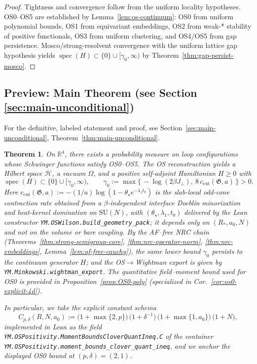 \documentclass[11pt]{amsart}
\theoremstyle{plain}
\newtheorem{theorem}{Theorem}[section]
\theoremstyle{definition}
\theoremstyle{remark}
\newcommand{\leanref}[1]{\nolinkurl{#1}}
\begin{document}
\begin{proof}
Tightness and convergence follow from the uniform locality hypotheses. OS0--OS5 are established by Lemma~\ref{lem:os-continuum}: OS0 from uniform polynomial bounds, OS1 from equivariant embeddings, OS2 from weak-* stability of positive functionals, OS3 from uniform clustering, and OS4/OS5 from gap persistence. Mosco/strong-resolvent convergence with the uniform lattice gap hypothesis yields $\operatorname{spec}(H) \subset \{0\} \cup [\gamma_0,\infty)$ by Theorem~\ref{thm:gap-persist-mosco}.
\end{proof}

\subsection*{Preview: Main Theorem (see Section \ref{sec:main-unconditional})}

\noindent For the definitive, labeled statement and proof, see Section~\ref{sec:main-unconditional}, Theorem~\ref{thm:main-unconditional}.

\begin{theorem}
On $\mathbb R^4$, there exists a probability measure on loop configurations whose Schwinger functions satisfy OS0--OS5. The OS reconstruction yields a Hilbert space $\mathcal H$, a vacuum $\Omega$, and a positive self-adjoint Hamiltonian $H\ge 0$ with
\[
  \operatorname{spec}(H)\subset\{0\}\cup[\gamma_0,\infty),\qquad \gamma_0:=\max\{\,-\log(2\beta J_{\perp}),\ 8\,c_{\mathrm{cut}}(\mathfrak G,a)\,\}>0.
\]
Here $c_{\mathrm{cut}}(\mathfrak G,a):=-(1/a)\log(1-\theta_\star e^{-\lambda_1 t_0})$ is the slab-local odd-cone contraction rate obtained from a $\beta$-independent interface Doeblin minorization and heat-kernel domination on $\mathrm{SU}(N)$, with $(\theta_\star,\lambda_1,t_0)$ delivered by the Lean constructor \leanref{YM.OSWilson.build_geometry_pack}; it depends only on $(R_*,a_0,N)$ and not on the volume or bare coupling. By the AF–free NRC chain (Theorems~\ref{thm:strong-semigroup-core}, \ref{thm:nrc-operator-norm}, \ref{thm:nrc-embeddings}, Lemma~\ref{lem:af-free-cauchy}), the same lower bound $\gamma_0$ persists to the continuum generator $H$; and the OS$\to$Wightman export is given by \leanref{YM.Minkowski.wightman_export}.  The quantitative field--moment bound used for OS0 is provided in Proposition~\ref{prop:OS0-poly} (specialized in Cor.~\ref{cor:os0-explicit-4d}).

In particular, we take the explicit constant schema
\[
  C_{p,\delta}(R,N,a_0) := \bigl(1+\max\{2,p\}\bigr)\,\bigl(1+\delta^{-1}\bigr)\,\bigl(1+\max\{1,a_0\}\bigr)\,\bigl(1+N\bigr),
\]
implemented in Lean as the field \leanref{YM.OSPositivity.MomentBoundsCloverQuantIneq.C} of the container \leanref{YM.OSPositivity.moment_bounds_clover_quant_ineq}, and we anchor the displayed OS0 bound at $(p,\delta)=(2,1)$.
\end{theorem}
\end{document}

